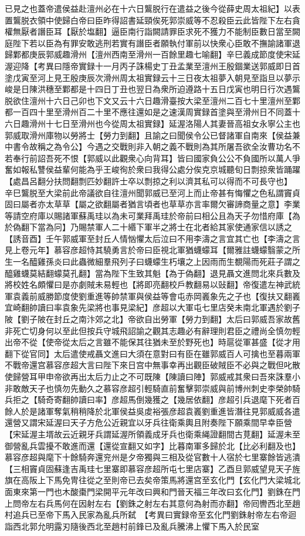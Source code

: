 已見之也蓋帝遣侯益赴澶州必在十六日鸗脱行在遣益之後今從薛史周太祖紀】以表置鸗脱衣領中使歸白帝曰臣昨得詔書延頸俟死郭崇威等不忍殺臣云此皆陛下左右貪權無厭者譖臣耳【厭於塩翻】逼臣南行詣闕請罪臣求死不獲力不能制臣數日當至闕庭陛下若以臣為有罪安敢逃刑若實有譖臣者願執付軍前以快衆心臣敢不撫諭諸軍退歸鄴都庚辰郭威趣滑州【澶州西南至滑州一百餘里趣七喻翻】辛巳義成節度使宋延渥迎降【考異曰隱帝實録十一月丙子誅楊史丁丑孟業至澶州王殷錮業送郭威即日首塗戊寅至河上見王殷庚辰次滑州周太祖實録云十三日夜太祖夢入朝見至詣旦以夢示峻是日陳洪穗至鄴都是十四日丁丑也翌日為衆所迫遵路十五日戊寅也明日行次遇鸗脱欲住澶州十六日己卯也下文又云十六日趣滑臺按大梁至澶州二百七十里澶州至鄴都一百四十里至滑州百二十里不應往還如是之速漢周實録首塗與至滑州日不同蓋十六日趣滑州十七日至滑州也今從周太祖實録】延渥洛陽人其妻晉高祖女永寧公主也郭威取滑州庫物以勞將士【勞力到翻】且諭之曰聞侯令公已督諸軍自南來【侯益兼中書令故稱之為令公】今遇之交戰則非入朝之義不戰則為其所屠吾欲全汝曹功名不若奉行前詔吾死不恨【郭威以此觀衆心向背耳】皆曰國家負公公不負國所以萬人爭奮如報私讐侯益輩何能為乎王峻徇於衆曰我得公處分俟克京城聽旬日剽掠衆皆踊躍【處昌呂翻分扶問翻剽匹妙翻許士卒以剽掠之利以濟其私可以得而不可長守也】　辛巳鸗脱至大梁前此帝議欲自往澶州聞郭威已至河上而止帝甚有悔懼之色私謂竇貞固曰屬者亦太草草【屬之欲翻屬者猶言頃者也草草亦言率爾欠審諦商量之意】李業等請空府庫以賜諸軍蘇禹珪以為未可業拜禹珪於帝前曰相公且為天子勿惜府庫【為於偽翻下當為冋】乃賜禁軍人二十緡下軍半之將士在北者給其家使通家信以誘之【誘音酉】壬午郭威軍至封丘人情忷懼太后泣曰不用李濤之言宜其亡也【李濤之言見上卷元年】慕容彦超恃其驍勇言於帝曰臣視北軍猶蠛蠓耳【爾雅註蠛蠓翳蒙之所生一名醯雞孫炎曰此蟲微細羣飛列子曰蠛蠓生朽壤之上因雨而生覩陽而死莊子謂之醯雞蠛莫結翻蠓莫孔翻】當為陛下生致其魁【為于偽翻】退見聶文進問北來兵數及將校姓名頗懼曰是亦劇賊未易輕也【將即亮翻校戶教翻易以䜴翻】帝復遣左神武統軍袁義前威勝節度使劉重進等帥禁軍與侯益等會屯赤岡㠖象先之子也【復扶又翻㠖宜崎翻帥讀曰率袁象先梁將也事見梁紀】彦超以大軍屯七里店癸未南北軍遇於劉子陂【劉子陂在封丘之南汴郊之北】帝欲自出勞軍【勞力到翻】太后曰郭威吾家故舊非死亡切身何以至此但按兵守城飛詔諭之觀其志趣必有辭理則君臣之禮尚全慎勿輕出帝不從【使帝從太后之言雖不能保其往猶未至於野死也】時扈從軍甚盛【從才用翻下從官同】太后遣使戒聶文進曰大須在意對曰有臣在雖郭威百人可擒也至暮兩軍不戰帝還宫慕容彦超大言曰陛下來日宫中無事幸再出觀臣破賊臣不必與之戰但叱散使歸營耳甲申帝欲再出太后力止之不可既陳【陳讀曰陣】郭威戒其衆曰吾來誅羣小非敢敵天子也慎勿先動久之慕容彦超引輕騎直前奮擊郭崇威與前博州刺史李榮帥騎兵拒之【騎奇寄翻帥讀曰率】彦超馬倒幾獲之【幾居依翻】彦超引兵退麾下死者百餘人於是諸軍奪氣稍稍降於北軍侯益吳䖍裕張彦超袁㠖劉重進皆潛往見郭威威各遣還營又謂宋延渥曰天子方危公近親宜以牙兵往衛乘輿且附奏陛下願乘間早幸臣營【宋延渥主壻故云近親牙兵謂延渥所領義成牙兵也衛乘䋲證翻間古莧翻】延渥未至御營亂兵雲擾不敢進而還【還從宣翻又如字】比暮南軍多歸於北【比必利翻及也】慕容彦超與麾下十餘騎奔還兖州是夕帝獨與三相及從官數十人宿於七里寨餘皆逃潰【三相竇貞固蘇逢吉禹珪七里寨即慕容彦超所屯七里店寨】乙酉旦郭威望見天子旌旗在高阪上下馬免冑往從之至則帝已去矣帝策馬將還宫至玄化門【玄化門大梁城北面東來第一門也木酸棗門梁開平元年改曰興和門晉天福三年改曰玄化門】劉銖在門上問帝左右兵馬何在因射左右【劉銖之射左右其意何為射而亦翻】帝囘轡西北至趙村追兵已至帝下馬入民家為亂兵所弑　【考異曰實録帝至玄化門劉銖射帝左右帝迴詣西北郭允明露刃隨後西北至趙村前鋒已及亂兵騰沸上懼下馬入於民室